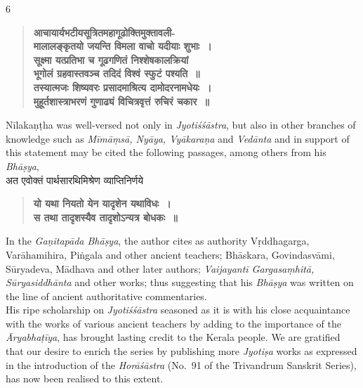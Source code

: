 \documentclass[11pt, openany]{book}
\begin{document}
\begin{center}
    6
\end{center}
\thispagestyle{empty} 

\begin{quote}
\textbf{आचायार्यभटीयसूत्रितमहागूढोक्तिमुक्तावली-\\
मालालङ्कृतयो जयन्ति विमला वाचो यदीयाः शुभाः~।\\
सूक्ष्मा यत्प्रतिभा च गूढगणितं निश्शेषकालक्रियां\\
भूगोलं ग्रहवास्तवञ्च तदिदं विश्वं स्फुटं पश्यति~॥\\
तस्यात्मजः शिष्यवरः प्रसादमाश्रित्य दामोदरनामधेयः~।\\
मुहूर्तशास्त्राभरणं गुणाढ्यं विचित्रवृत्तं रुचिरं चकार~॥}
\end{quote}

{\en Nīlakaṇṭha was well-versed not only in \emph{Jyotiśśāstra}, but also in other branches of knowledge such as \emph{Mīmāṃsā, Nyāya, Vyākaraṇa} and \emph{Vedānta} and in support of this statement may be cited the following passages, among others from his \emph{Bhāṣya}},\\

{\s अत एवोक्तं पार्थसारथिमिश्रेण व्याप्तिनिर्णये}\textendash 
\begin{quote}
\textbf{यो यथा नियतो येन यादृशेन यथाविधः~।\\
स तथा तादृशस्यैव तादृशोऽन्यत्र बोधकः~॥}
\end{quote}

{\en In the \emph{Gaṇitapāda Bhāṣya}, the author cites as authority Vṛddhagarga, Varāhamihira, Piṅgala and other ancient teachers; Bhāskara, Govindasvāmi, Sūryadeva, Mādhava and other later authors; \emph{Vaijayantī Gargasaṃhitā, Sūryasiddhānta} and other works; thus suggesting that his \emph{Bhāṣya}
was written on the line of ancient authoritative commentaries.\\

His ripe scholarship on \emph{Jyotiśśāstra} seasoned as it is with his close acquaintance with the works of various ancient teachers by adding to the importance of the \emph{Āryabhaṭīya}, has brought lasting credit to the Kerala people. We are gratified that our desire to enrich the series by publishing more \emph{Jyotiṣa} works as expressed in the introduction of the \emph{Horāśāstra} (No.~91 of the Trivandrum Sanskrit Series), has now been realised to this extent.}\\
\end{document}
